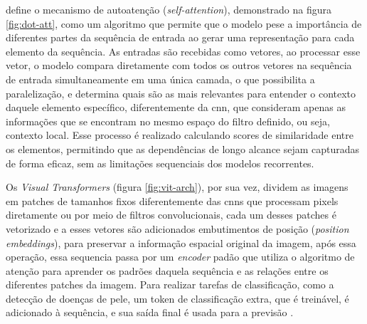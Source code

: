  define o mecanismo de autoatenção (\textit{self-attention}), demonstrado na figura \ref{fig:dot-att}, como um algoritmo que permite que o modelo pese a importância de diferentes partes da sequência de entrada ao gerar uma representação para cada elemento da sequência. As entradas são recebidas como vetores, ao processar esse vetor, o modelo compara diretamente com todos os outros vetores na sequência de entrada simultaneamente em uma única camada, o que possibilita a paralelização, e determina quais são as mais relevantes para entender o contexto daquele elemento específico, diferentemente da \gls{cnn}, que consideram apenas as informações que se encontram no mesmo espaço do filtro definido, ou seja, contexto local. 
 Esse processo é realizado calculando scores de similaridade entre os elementos, permitindo que as dependências de longo alcance sejam capturadas de forma eficaz, sem as limitações sequenciais dos modelos recorrentes.

%

Os \textit{Visual Transformers} (figura \ref{fig:vit-arch}), por sua vez, dividem as imagens em patches de tamanhos fixos diferentemente das \gls{cnn}s que processam pixels diretamente ou por meio de filtros convolucionais, cada um desses patches é vetorizado e a esses vetores são adicionados embutimentos de posição (\textit{position embeddings}), para preservar a informação espacial original da imagem, após essa operação, essa sequencia passa por um \textit{encoder} padão que utiliza o algoritmo de atenção para aprender os padrões daquela sequência e as relações entre os diferentes patches da imagem. Para realizar tarefas de classificação, como a detecção de doenças de pele, um token de classificação extra, que é treinável, é adicionado à sequência, e sua saída final é usada para a previsão \cite{Dosovitskiy}.
\newline
\newline
\newline

